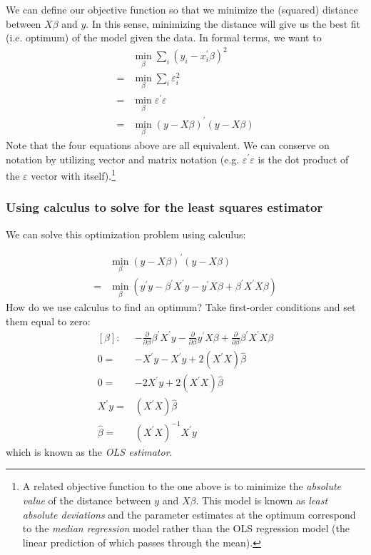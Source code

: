 \documentclass[12pt,english]{article}
\begin{document}
We can define our objective function so that we minimize the (squared) distance between $X\beta$ and $y$. In this sense, minimizing the distance will give us the best fit (i.e. optimum) of the model given the data. In formal terms, we want to
\begin{align}
 & \min_{\beta}\sum_{i}\left(y_{i}-x_{i}^{\prime}\beta\right)^{2}\nonumber \\
= & \min_{\beta}\sum_{i}\varepsilon_{i}^{2}\nonumber \\
= & \min_{\beta}\varepsilon^{\prime}\varepsilon\label{eq:3}\\
= & \min_{\beta}\left(y-X\beta\right)^{\prime}\left(y-X\beta\right)\nonumber 
\end{align}
Note that the four equations above are all equivalent. We can conserve on notation by utilizing vector and matrix notation (e.g. $\varepsilon^{\prime}\varepsilon$ is the dot product of the $\varepsilon$ vector with itself).\footnote{A related objective function to the one above is to minimize the \emph{absolute value} of the distance between $y$ and $X\beta$. This model is known as \emph{least absolute deviations} and the parameter estimates at the optimum correspond to the \emph{median regression} model rather than the OLS regression model (the linear prediction of which passes through the mean).}

\subsubsection{Using calculus to solve for the least squares estimator}

We can solve this optimization problem using calculus:

\begin{align*}
 & \min_{\beta}\left(y-X\beta\right)^{\prime}\left(y-X\beta\right)\\
    = & \min_{\beta}\left(y^{\prime}y-\beta^{\prime}X^{\prime}y-y^{\prime}X\beta+\beta^{\prime}X^{\prime}X\beta\right)
\end{align*}
How do we use calculus to find an optimum? Take first-order conditions and set them equal to zero:
\begin{align}
\left[\beta\right]: & -\frac{\partial}{\partial\beta}\beta^{\prime}X^{\prime}y-\frac{\partial}{\partial\beta}y^{\prime}X\beta+\frac{\partial}{\partial\beta}\beta^{\prime}X^{\prime}X\beta\label{eq:4}\\
0= & -X^{\prime}y-X^{\prime}y+2\left(X^{\prime}X\right)\hat{\beta}\nonumber \\
0= & -2X^{\prime}y+2\left(X^{\prime}X\right)\hat{\beta}\nonumber \\
X^{\prime}y= & \left(X^{\prime}X\right)\hat{\beta}\nonumber \\
\hat{\beta}= & \left(X^{\prime}X\right)^{-1}X^{\prime}y\nonumber 
\end{align}
which is known as the \emph{OLS estimator}.
\end{document}
